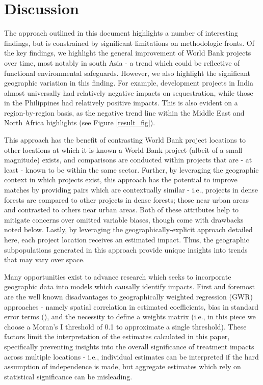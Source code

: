 \documentclass{article}\usepackage[]{graphicx}\usepackage[]{color}
\newenvironment{knitrout}{}{}  %
\begin{document}
\begin{knitrout}
\newpage
\section{Discussion}
The approach outlined in this document highlights a number of interesting findings, but is constrained by significant limitations on methodologic fronts.
Of the key findings, we highlight the general improvement of World Bank projects over time, most notably in south Asia - a trend which could be reflective of functional environmental safeguards.  
However, we also highlight the significant geographic variation in this finding.  For example, development projects in India almost universally had relatively negative impacts on sequestration, while those in the Philippines had relatively positive impacts.  
This is also evident on a region-by-region basis, as the negative trend line within the Middle East and North Africa highlights (see Figure \ref{result_fig}).  
\par
This approach has the benefit of contrasting World Bank project locations to other locations at which it is known a World Bank project (albeit of a small magnitude) exists, and comparisons are conducted within projects that are - at least - known to be within the same sector. 
Further, by leveraging the geographic context in which projects exist, this approach has the potential to improve matches by providing pairs which are contextually similar - i.e., projects in dense forests are compared to other projects in dense forests; those near urban areas and contrasted to others near urban areas.
Both of these attributes help to mitigate concerns over omitted variable biases, though come with drawbacks noted below.
Lastly, by leveraging the geographically-explicit approach detailed here, each project location receives an estimated impact.
Thus, the geographic subpopulations generated in this approach provide unique insights into trends that may vary over space.
\par
Many opportunities exist to advance research which seeks to incorporate geographic data into models which causally identify impacts.
First and foremost are the well known disadvantages to geographically weighted regression (GWR) approaches - namely spatial correlation in estimated coefficients, bias in standard error terms (\cite{wheeler_multicollinearity_2005}), and the necessity to define a weights matrix (i.e., in this piece we choose a Moran's I threshold of 0.1 to approximate a single threshold).  
These factors limit the interpretation of the estimates calculated in this paper, specifically preventing insights into the overall significance of treatment impacts across multiple locations - i.e., individual estimates can be interpreted if the hard assumption of independence is made, but aggregate estimates which rely on statistical significance can be misleading.

\end{knitrout}
\end{document}
